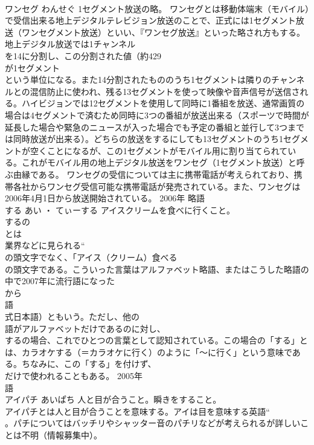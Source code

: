\documentclass[8pt]{extreport}
\begin{document}
\begin{CJK}{UTF8}{min}
\\	ワンセグ	わんせぐ	1セグメント放送の略。	ワンセグとは移動体端末（モバイル）で受信出来る地上デジタルテレビジョン放送のことで、正式には1セグメント放送（ワンセグメント放送）といい、『ワンセグ放送』といった略され方もする。 地上デジタル放送では1チャンネル
\\	を14に分割し、この分割された値（約429
\\	が1セグメント
\\	という単位になる。また14分割されたもののうち1セグメントは隣りのチャンネルとの混信防止に使われ、残る13セグメントを使って映像や音声信号が送信される。ハイビジョンでは12セグメントを使用して同時に1番組を放送、通常画質の場合は4セグメントで済むため同時に3つの番組が放送出来る（スポーツで時間が延長した場合や緊急のニュースが入った場合でも予定の番組と並行して3つまでは同時放送が出来る）。どちらの放送をするにしても13セグメントのうち1セグメントが空くことになるが、この1セグメントがモバイル用に割り当てられている。これがモバイル用の地上デジタル放送をワンセグ（1セグメント放送）と呼ぶ由縁である。 ワンセグの受信については主に携帯電話が考えられており、携帯各社からワンセグ受信可能な携帯電話が発売されている。また、ワンセグは2006年4月1日から放送開始されている。	2006年	略語	
\\	する	あい ・ てぃーする	アイスクリームを食べに行くこと。	
\\	するの
\\	とは
\\	業界などに見られる“
\\	の頭文字でなく、「アイス（クリーム）食べる
\\	の頭文字である。こういった言葉はアルファベット略語、またはこうした略語の中で2007年に流行語になった
\\	から
\\	語
\\	式日本語）ともいう。ただし、他の
\\	語がアルファベットだけであるのに対し、
\\	するの場合、これでひとつの言葉として認知されている。この場合の「する」とは、カラオケする（＝カラオケに行く）のように「～に行く」という意味である。ちなみに、この「する」を付けず、
\\	だけで使われることもある。	2005年	
\\	語	
\\	アイパチ	あいぱち	人と目が合うこと。瞬きをすること。	
\\	アイパチとは人と目が合うことを意味する。アイは目を意味する英語“
\\	。パチについてはバッチリやシャッター音のパチリなどが考えられるが詳しいことは不明（情報募集中）。 

\end{CJK}
\end{document}
